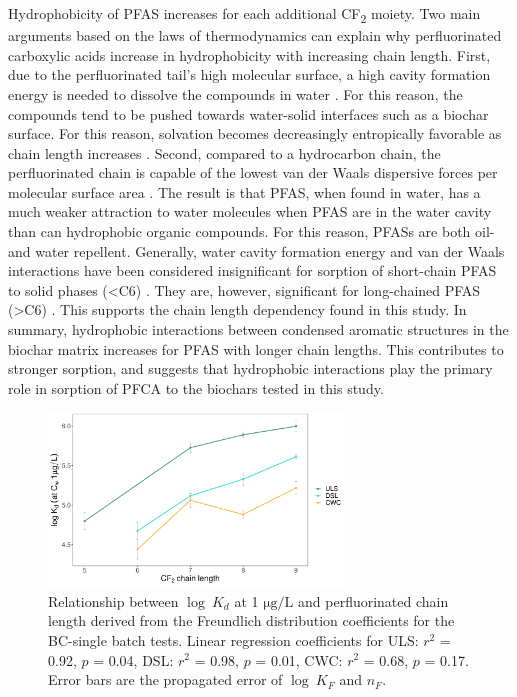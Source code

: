 Hydrophobicity of PFAS increases for each additional CF\textsubscript{2} moiety. Two main arguments based on the laws of thermodynamics can explain why perfluorinated carboxylic acids increase in hydrophobicity with increasing chain length. First, due to the perfluorinated tail's high molecular surface, a high cavity formation energy is needed to dissolve the compounds in water \citep{Arp2006}. For this reason, the compounds tend to be pushed towards water-solid interfaces such as a biochar surface. For this reason, solvation becomes decreasingly entropically favorable as chain length increases \citep{sigmund2022sorption}. Second, compared to a hydrocarbon chain, the perfluorinated chain is capable of the lowest van der Waals dispersive forces per molecular surface area \citep{du2014adsorption}. The result is that PFAS, when found in water, has a much weaker attraction to water molecules when PFAS are in the water cavity than can hydrophobic organic compounds. For this reason, PFASs are both oil- and water repellent. Generally, water cavity formation energy and van der Waals interactions have been considered insignificant for sorption of short-chain PFAS to solid phases (\textless C6) \citep{du2014adsorption}. They are, however, significant for long-chained PFAS (\textgreater C6) \citep{du2014adsorption}. This supports the chain length dependency found in this study. In summary, hydrophobic interactions between condensed aromatic structures in the biochar matrix increases for PFAS with longer chain lengths. This contributes to stronger sorption, and suggests that hydrophobic interactions play the primary role in sorption of PFCA to the biochars tested in this study. 

\begin{figure}[bth]
    \centering
    \includegraphics[width=0.7\textwidth]{R/figs/chain_length_Kd1ugL_plot.pdf}
    \caption{Relationship between $\log~K_d$ at 1 $\mathrm{\mu g/L}$ and perfluorinated chain length derived from the Freundlich distribution coefficients for the BC-single batch tests. Linear regression coefficients for ULS: $r^2$ = 0.92, $p$ = 0.04, DSL: $r^2$ = 0.98, $p$ = 0.01, CWC: $r^2$ = 0.68, $p$ = 0.17. Error bars are the propagated error of $\log~K_F$ and $n_F$.}
    \label{fig:chainlength}
\end{figure}

